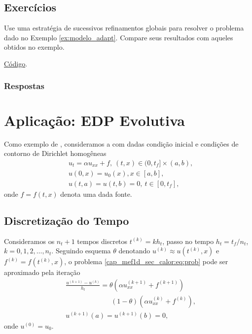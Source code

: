 \subsection{Exercícios}
\badgeRevisar

\begin{exer}\label{exer:modelo_refglobal}
  Use uma estratégia de sucessivos refinamentos globais para resolver o problema dado no Exemplo \ref{ex:modelo_adapt}. Compare seus resultados com aqueles obtidos no exemplo.
\end{exer}
\begin{resp}
  \ifispython
  \href{https://github.com/phkonzen/notas/blob/master/src/MetodoElementosFinitos/cap_mef1d/dados/exer_dcr/exer_dcr.py}{Código}.
  \fi  
\end{resp}

\ifisbook
\subsubsection{Respostas}
\shipoutAnswer
\fi


\section{Aplicação: EDP Evolutiva}\label{cap_mef1d_sec_calor}
\badgeRevisar

Como exemplo de , consideramos a  com dadas condição inicial e condições de contorno de Dirichlet homogêneas
\begin{subequations}\label{cap_mef1d_sec_calor:eq:prob}
  \begin{align}
    &u_t = \alpha u_{xx} + f, ~(t,x)\in (0, t_f]\times (a, b),\\
    &u(0, x) = u_0(x), x\in [a, b],\\
    &u(t, a) = u(t, b) = 0, ~t\in [0, t_f],
  \end{align}
\end{subequations}
onde $f = f(t, x)$ denota uma dada fonte.

\subsection{Discretização do Tempo}

Consideramos os $n_t+1$ tempos discretos $t^{(k)} = k h_t$, passo no tempo $h_t = t_f/n_t$, $k = 0, 1, 2, \dotsc, n_t$. Seguindo esquema $\theta$ denotando $u^{(k)} \approx u\left(t^{(k)}, x\right)$ e $f^{(k)} = f\left(t^{(k)}, x\right)$, o problema \eqref{cap_mef1d_sec_calor:eq:prob} pode ser aproximado pela iteração
\begin{subequations}\label{cap_mef1d_sec_calor:eq:theta}
  \begin{align}
    &\frac{u^{(k+1)} - u^{(k)}}{h_t} = \theta \left(\alpha u^{(k+1)}_{xx} + f^{(k+1)}\right)\nonumber\\
    &\qquad\qquad\qquad\;\; (1-\theta) \left(\alpha u^{(k)}_{xx} + f^{(k)}\right),\\
    &u^{(k+1)}(a) = u^{(k+1)}(b) = 0,
  \end{align}
\end{subequations}
onde $u^{(0)} = u_0$. 


